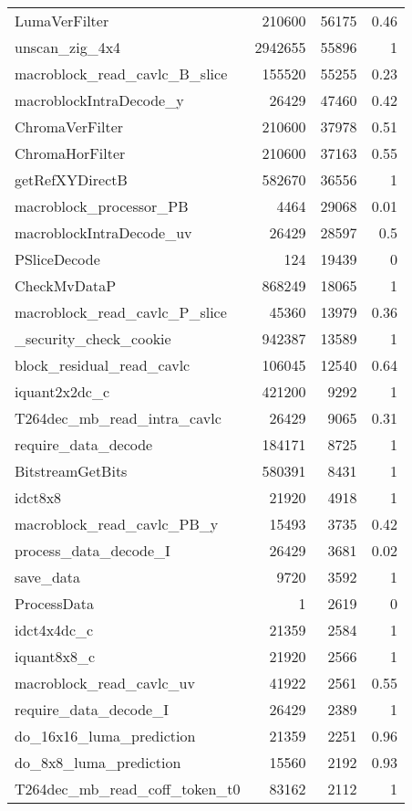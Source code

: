 \begin{longtable}[\textwidth]{lrrr}
    LumaVerFilter & 210600 & 56175 & 0.46 \\
    unscan\_zig\_4x4 & 2942655 & 55896 & 1 \\
    macroblock\_read\_cavlc\_B\_slice & 155520 & 55255 & 0.23 \\
    macroblockIntraDecode\_y & 26429 & 47460 & 0.42 \\
    ChromaVerFilter & 210600 & 37978 & 0.51 \\
    ChromaHorFilter & 210600 & 37163 & 0.55 \\
    getRefXYDirectB & 582670 & 36556 & 1 \\
    macroblock\_processor\_PB & 4464  & 29068 & 0.01 \\
    macroblockIntraDecode\_uv & 26429 & 28597 & 0.5 \\
    PSliceDecode & 124   & 19439 & 0 \\
    CheckMvDataP & 868249 & 18065 & 1 \\
    macroblock\_read\_cavlc\_P\_slice & 45360 & 13979 & 0.36 \\
    \_security\_check\_cookie & 942387 & 13589 & 1 \\
    block\_residual\_read\_cavlc & 106045 & 12540 & 0.64 \\
    iquant2x2dc\_c & 421200 & 9292  & 1 \\
    T264dec\_mb\_read\_intra\_cavlc & 26429 & 9065  & 0.31 \\
    require\_data\_decode & 184171 & 8725  & 1 \\
    BitstreamGetBits & 580391 & 8431  & 1 \\
    idct8x8 & 21920 & 4918  & 1 \\
    macroblock\_read\_cavlc\_PB\_y & 15493 & 3735  & 0.42 \\
    process\_data\_decode\_I & 26429 & 3681  & 0.02 \\
    save\_data & 9720  & 3592  & 1 \\
    ProcessData & 1     & 2619  & 0 \\
    idct4x4dc\_c & 21359 & 2584  & 1 \\
    iquant8x8\_c & 21920 & 2566  & 1 \\
    macroblock\_read\_cavlc\_uv & 41922 & 2561  & 0.55 \\
    require\_data\_decode\_I & 26429 & 2389  & 1 \\
    do\_16x16\_luma\_prediction & 21359 & 2251  & 0.96 \\
    do\_8x8\_luma\_prediction & 15560 & 2192  & 0.93 \\
    T264dec\_mb\_read\_coff\_token\_t0 & 83162 & 2112  & 1 \\
    \bottomrule[1.5pt]
\end{longtable}
